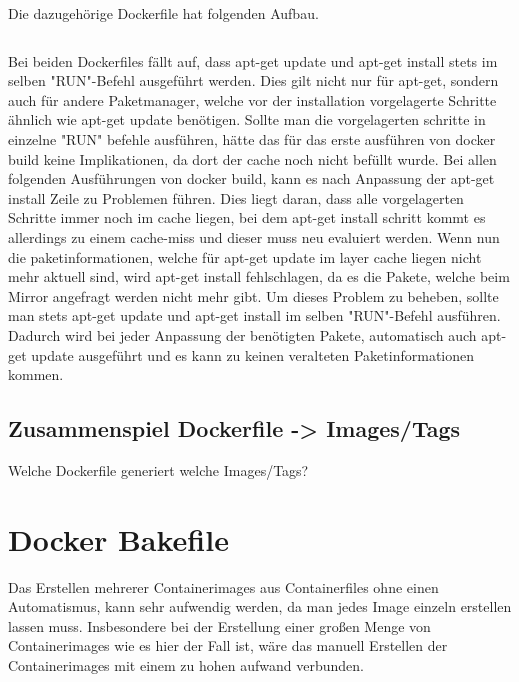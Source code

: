 Die dazugehörige Dockerfile hat folgenden Aufbau.

\inputminted{dockerfile}{./code-examples/Dockerfile.spack}

Bei beiden Dockerfiles fällt auf, dass apt-get update und apt-get install stets im selben "RUN"-Befehl ausgeführt werden. Dies gilt nicht nur für apt-get, sondern auch für andere Paketmanager, welche vor der installation vorgelagerte Schritte ähnlich wie apt-get update benötigen. Sollte man die vorgelagerten schritte in einzelne "RUN" befehle ausführen, hätte das für das erste ausführen von docker build keine Implikationen, da dort der cache noch nicht befüllt wurde. Bei allen folgenden Ausführungen von docker build, kann es nach Anpassung der apt-get install Zeile zu Problemen führen. Dies liegt daran, dass alle vorgelagerten Schritte immer noch im cache liegen, bei dem apt-get install schritt kommt es allerdings zu einem cache-miss und dieser muss neu evaluiert werden. Wenn nun die paketinformationen, welche für apt-get update im layer cache liegen nicht mehr aktuell sind, wird apt-get install fehlschlagen, da es die Pakete, welche beim Mirror angefragt werden nicht mehr gibt. Um dieses Problem zu beheben, sollte man stets apt-get update und apt-get install im selben "RUN"-Befehl ausführen. Dadurch wird bei jeder Anpassung der benötigten Pakete, automatisch auch apt-get update ausgeführt und es kann zu keinen veralteten Paketinformationen kommen. 

\subsection{Zusammenspiel Dockerfile -> Images/Tags}

Welche Dockerfile generiert welche Images/Tags?

\section{Docker Bakefile}

Das Erstellen mehrerer Containerimages aus Containerfiles ohne einen Automatismus, kann sehr aufwendig werden, da man jedes Image einzeln erstellen lassen muss. Insbesondere bei der Erstellung einer großen Menge von Containerimages wie es hier der Fall ist, wäre das manuell Erstellen der Containerimages mit einem zu hohen aufwand verbunden. 

